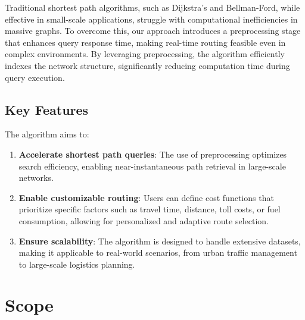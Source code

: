 	Traditional shortest path algorithms, such as Dijkstra’s and Bellman-Ford, while effective in small-scale applications, struggle with computational inefficiencies in massive graphs. To overcome this, our approach introduces a preprocessing stage that enhances query response time, making real-time routing feasible even in complex environments. By leveraging preprocessing, the algorithm efficiently indexes the network structure, significantly reducing computation time during query execution.
	
	\subsection{Key Features}
	The algorithm aims to:
	\begin{enumerate}
		\item \textbf{Accelerate shortest path queries}: The use of preprocessing optimizes search efficiency, enabling near-instantaneous path retrieval in large-scale networks.
		\item \textbf{Enable customizable routing}: Users can define cost functions that prioritize specific factors such as travel time, distance, toll costs, or fuel consumption, allowing for personalized and adaptive route selection.
		\item \textbf{Ensure scalability}: The algorithm is designed to handle extensive datasets, making it applicable to real-world scenarios, from urban traffic management to large-scale logistics planning.
	\end{enumerate}
	
	\section{Scope}
	
